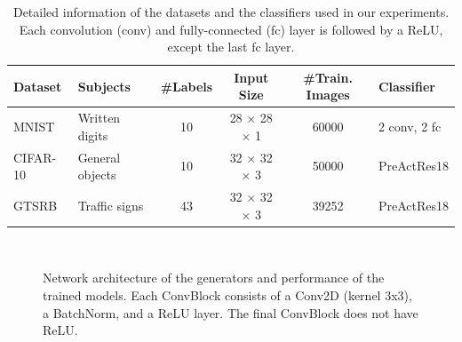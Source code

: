\begin{table}[h]
    \centering
    \caption{Detailed information of the datasets and the classifiers used in our experiments. Each convolution (conv) and fully-connected (fc) layer is followed by a  ReLU, except the last fc layer. }
    \vskip 0.05in
    \label{tab:dataset_detail}
    \begin{tabu} to \textwidth {llcccl}
    \toprule
    Dataset & Subjects & \#Labels & Input Size & \#Train. Images & Classifier\\
    \midrule
    MNIST & Written digits & 10 & 28 $\times$ 28 $\times$ 1 & 60000 & 2 conv, 2 fc\\
    CIFAR-10 & General objects & 10 & 32 $\times$ 32 $\times$ 3 & 50000 & PreActRes18 \cite{he2016identity}\\
    GTSRB & Traffic signs & 43 & 32 $\times$ 32 $\times$ 3 & 39252 & PreActRes18 \cite{he2016identity}\\
    \bottomrule
    \end{tabu}
    \vspace{-1.0em}
\end{table}

\begin{figure}[t]
\centering
{}
~
\caption{Network architecture of the generators and performance of the trained models. Each ConvBlock consists of a Conv2D (kernel 3x3), a BatchNorm, and a ReLU layer. The final ConvBlock does not have ReLU. }
\vspace{-6mm}
\label{fig:samples}
\end{figure}

